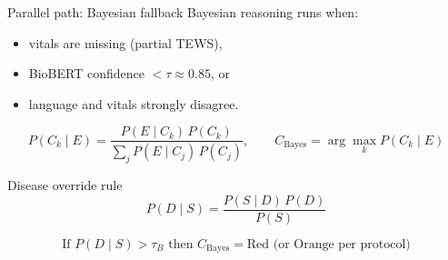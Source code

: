 \begin{frame}{Parallel path: Bayesian fallback}
  Bayesian reasoning runs when:
  \begin{itemize}
    \item vitals are missing (partial TEWS),
    \item BioBERT confidence $< \tau \approx 0.85$, or
    \item language and vitals strongly disagree.
  \end{itemize}

  \begin{equation*}
    P(C_k \mid E) = \frac{P(E \mid C_k)\, P(C_k)}{\sum_{j} P(E \mid C_j)\, P(C_j)},
    \qquad
    C_{\mathrm{Bayes}} = \arg\max_{k} P(C_k \mid E)
  \end{equation*}

\end{frame}

\begin{frame}{Disease override rule}
  \begin{equation*}
    P(D \mid S) = \frac{P(S \mid D)\, P(D)}{P(S)}
  \end{equation*}

  \begin{equation*}
    \text{If } P(D \mid S) > \tau_B \text{ then } C_{\mathrm{Bayes}} = \text{Red (or Orange per protocol)}
  \end{equation*}


\end{frame}
